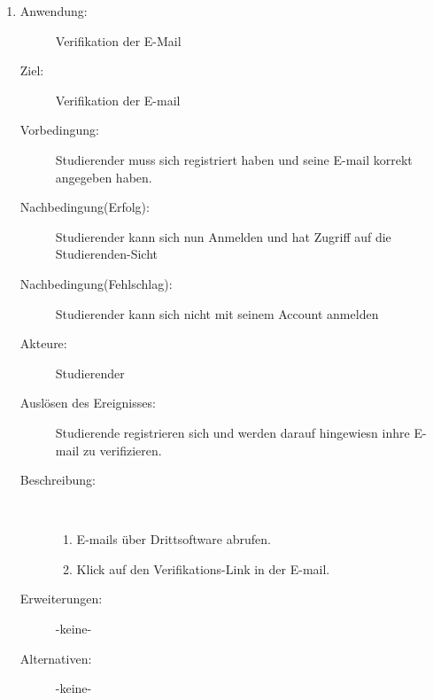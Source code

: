 \documentclass[parskip=full]{scrartcl}
\newcommand{\swtLabel}[1]{\textbf{/#1\arabic*0/}}
\begin{document}
\begin{enumerate}[label=\swtLabel{S}]
  \item
    \begin{description}
    \item[Anwendung:] Verifikation der E-Mail
    \item[Ziel:] Verifikation der E-mail
    \item[Vorbedingung:] Studierender muss sich registriert haben und seine
    E-mail korrekt angegeben haben.
    \item[Nachbedingung(Erfolg):] Studierender kann sich nun Anmelden und hat
    Zugriff auf die Studierenden-Sicht
    \item[Nachbedingung(Fehlschlag):] Studierender kann sich nicht mit seinem
    Account anmelden
    \item[Akteure:] Studierender
    \item[Auslösen des Ereignisses:] Studierende registrieren sich und werden
    darauf hingewiesn inhre E-mail zu verifizieren.
    \item[Beschreibung:]~
    \begin{enumerate}
      \item E-mails über Drittsoftware abrufen.
      \item Klick auf den Verifikations-Link in der E-mail.      
    \end{enumerate}
    \item[Erweiterungen:] -keine-
    \item[Alternativen:] -keine-
      \end{description}
  

\end{enumerate}
\end{document}
